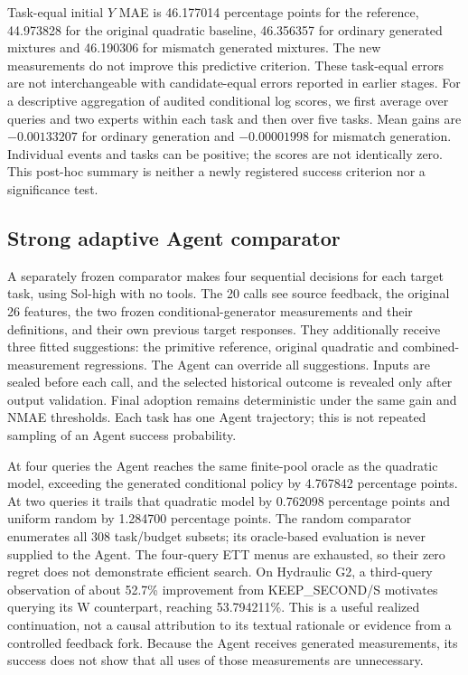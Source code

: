 \documentclass[10pt]{article}
\begin{document}
Task-equal initial $Y$ MAE is 46.177014 percentage points for the reference, 44.973828 for the original quadratic baseline, 46.356357 for ordinary generated mixtures and 46.190306 for mismatch generated mixtures.
The new measurements do not improve this predictive criterion.
These task-equal errors are not interchangeable with candidate-equal errors reported in earlier stages.
For a descriptive aggregation of audited conditional log scores, we first average over queries and two experts within each task and then over five tasks.
Mean gains are $-0.00133207$ for ordinary generation and $-0.00001998$ for mismatch generation.
Individual events and tasks can be positive; the scores are not identically zero.
This post-hoc summary is neither a newly registered success criterion nor a significance test.

\subsection{Strong adaptive Agent comparator}
A separately frozen comparator makes four sequential decisions for each target task, using Sol-high with no tools.
The 20 calls see source feedback, the original 26 features, the two frozen conditional-generator measurements and their definitions, and their own previous target responses.
They additionally receive three fitted suggestions: the primitive reference, original quadratic and combined-measurement regressions.
The Agent can override all suggestions.
Inputs are sealed before each call, and the selected historical outcome is revealed only after output validation.
Final adoption remains deterministic under the same gain and NMAE thresholds.
Each task has one Agent trajectory; this is not repeated sampling of an Agent success probability.

At four queries the Agent reaches the same finite-pool oracle as the quadratic model, exceeding the generated conditional policy by 4.767842 percentage points.
At two queries it trails that quadratic model by 0.762098 percentage points and uniform random by 1.284700 percentage points.
The random comparator enumerates all 308 task/budget subsets; its oracle-based evaluation is never supplied to the Agent.
The four-query ETT menus are exhausted, so their zero regret does not demonstrate efficient search.
On Hydraulic G2, a third-query observation of about 52.7\% improvement from KEEP\_SECOND/S motivates querying its W counterpart, reaching 53.794211\%.
This is a useful realized continuation, not a causal attribution to its textual rationale or evidence from a controlled feedback fork.
Because the Agent receives generated measurements, its success does not show that all uses of those measurements are unnecessary.
\end{document}
